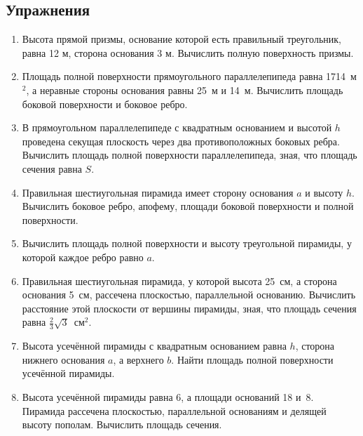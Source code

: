 {\small

\subsection*{Упражнения}



\begin{enumerate}[noitemsep]

\item
Высота прямой призмы, основание которой есть правильный треугольник, равна 12 м, сторона основания 3 м.
Вычислить полную поверхность призмы.

\item
Площадь полной поверхности прямоугольного параллелепипеда равна 1714~м$^2$, а неравные стороны основания равны 25~м и 14~м.
Вычислить площадь боковой поверхности и боковое ребро.

\item
В прямоугольном параллелепипеде с квадратным основанием и высотой $h$ проведена секущая плоскость через два противоположных боковых ребра.
Вычислить площадь полной поверхности параллелепипеда, зная, что площадь сечения равна $S$.

\item
Правильная шестиугольная пирамида имеет сторону основания $a$ и высоту $h$.
Вычислить боковое ребро, апофему, площади боковой поверхности и полной поверхности.

\item
Вычислить площадь полной поверхности и высоту треугольной пирамиды, у которой каждое ребро равно $a$.

\item
Правильная шестиугольная пирамида, у которой высота 25~см, а сторона основания 5~см, рассечена плоскостью, параллельной основанию.
Вычислить расстояние этой плоскости от вершины пирамиды, зная, что площадь сечения равна $\tfrac23\sqrt{3}$~см$^2$.

\item
Высота усечённой пирамиды с квадратным основанием равна $h$, сторона нижнего основания $a$, а верхнего $b$.
Найти площадь полной поверхности усечённой пирамиды.

\item
Высота усечённой пирамиды равна 6, а площади оснований 18 и~8.
Пирамида рассечена плоскостью, параллельной основаниям и делящей высоту пополам.
Вычислить площадь сечения.
\end{enumerate}

}

